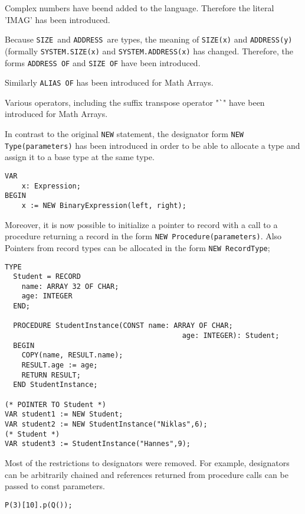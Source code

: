 \documentclass[a4wide,11pt]{article}
\newcommand{\ADDRESS}{\lstinline"ADDRESS"}
\newcommand{\SIZE}{\lstinline"SIZE"}
\begin{document}
\begin{annotation}
Complex numbers have beend added to the language.
Therefore the literal 'IMAG' has been introduced.

Because \SIZE\ and \ADDRESS\ are types, the meaning of \lstinline"SIZE(x)" and \lstinline"ADDRESS(y)" (formally \lstinline"SYSTEM.SIZE(x)" and \lstinline"SYSTEM.ADDRESS(x)" has changed.
Therefore, the forms \lstinline"ADDRESS OF" and \lstinline"SIZE OF" have been introduced.

Similarly \lstinline"ALIAS OF" has been introduced for Math Arrays.

Various operators, including the suffix transpose operator "\lstinline~`~" have been introduced for Math Arrays.


In contrast to the original \lstinline"NEW" statement, the designator form \lstinline"NEW Type(parameters)" has been introduced in order to be able to allocate a type and assign it to a base type at the same type.
\begin{lstlisting}[style=example]
VAR
	x: Expression;
BEGIN
	x := NEW BinaryExpression(left, right);
\end{lstlisting}

Moreover, it is now possible to initialize a pointer to record with a call to a procedure returning a record in the form \lstinline"NEW Procedure(parameters)". Also Pointers from record types can be allocated in the form \lstinline"NEW RecordType";

\begin{lstlisting}[style=example]
TYPE
  Student = RECORD
    name: ARRAY 32 OF CHAR;
    age: INTEGER
  END;

  PROCEDURE StudentInstance(CONST name: ARRAY OF CHAR;
                                          age: INTEGER): Student;
  BEGIN
    COPY(name, RESULT.name);
    RESULT.age := age;
    RETURN RESULT;
  END StudentInstance;

(* POINTER TO Student *)
VAR student1 := NEW Student;
VAR student2 := NEW StudentInstance("Niklas",6);
(* Student *)
VAR student3 := StudentInstance("Hannes",9);
\end{lstlisting}

Most of the restrictions to designators were removed.
For example, designators can be arbitrarily chained and references returned from procedure calls can be passed to const parameters.

\begin{lstlisting}[style=example, caption=Example of a syntactially valid designator]
	P(3)[10].p(Q());
\end{lstlisting}

\end{annotation}
\end{document}
